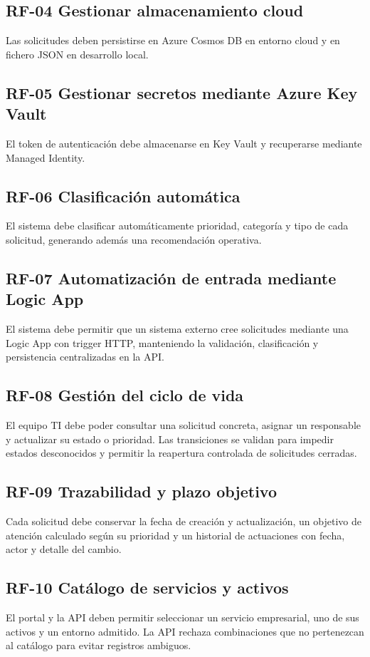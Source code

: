 \subsection{RF-04 Gestionar almacenamiento cloud}
Las solicitudes deben persistirse en Azure Cosmos DB en entorno cloud y en fichero JSON en desarrollo local.

\subsection{RF-05 Gestionar secretos mediante Azure Key Vault}
El token de autenticación debe almacenarse en Key Vault y recuperarse mediante Managed Identity.

\subsection{RF-06 Clasificación automática}
El sistema debe clasificar automáticamente prioridad, categoría y tipo de cada solicitud, generando además una recomendación operativa.

\subsection{RF-07 Automatización de entrada mediante Logic App}
El sistema debe permitir que un sistema externo cree solicitudes mediante una Logic App con trigger HTTP, manteniendo la validación, clasificación y persistencia centralizadas en la API.

\subsection{RF-08 Gestión del ciclo de vida}
El equipo TI debe poder consultar una solicitud concreta, asignar un responsable y actualizar su estado o prioridad. Las transiciones se validan para impedir estados desconocidos y permitir la reapertura controlada de solicitudes cerradas.

\subsection{RF-09 Trazabilidad y plazo objetivo}
Cada solicitud debe conservar la fecha de creación y actualización, un objetivo de atención calculado según su prioridad y un historial de actuaciones con fecha, actor y detalle del cambio.

\subsection{RF-10 Catálogo de servicios y activos}
El portal y la API deben permitir seleccionar un servicio empresarial, uno de sus activos y un entorno admitido. La API rechaza combinaciones que no pertenezcan al catálogo para evitar registros ambiguos.

